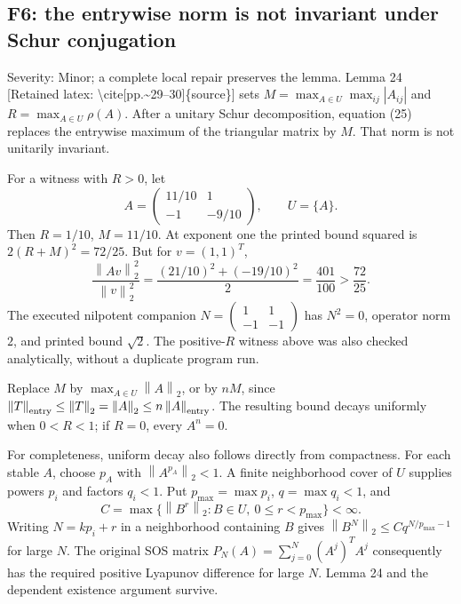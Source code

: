 \documentclass[10pt]{article}
\begin{document}
\subsection*{F6: the entrywise norm is not invariant under Schur conjugation}
Severity: Minor; a complete local repair preserves the lemma. Lemma 24 [Retained latex: \textbackslash{}cite[pp.\textasciitilde{}29--30]\{source\}] sets \(M=\max_{A\in U}\max_{ij}|A_{ij}|\) and \(R=\max_{A\in U}\rho(A)\). After a unitary Schur decomposition, equation (25) replaces the entrywise maximum of the triangular matrix by \(M\). That norm is not unitarily invariant.\par
For a witness with \(R>0\), let \[A=\begin{pmatrix}11/10&1\\-1&-9/10\end{pmatrix},\qquad U=\{A\}.\] Then \(R=1/10\), \(M=11/10\). At exponent one the printed bound squared is \(2(R+M)^2=72/25\). But for \(v=(1,1)^T\), \[\frac{\left\lVert Av\right\rVert_2^2}{\left\lVert v\right\rVert_2^2}
 =\frac{(21/10)^2+(-19/10)^2}{2}
 =\frac{401}{100}>\frac{72}{25}.\] The executed nilpotent companion \(N=\left(\begin{smallmatrix}1&1\\-1&-1\end{smallmatrix}\right)\) has \(N^2=0\), operator norm \(2\), and printed bound \(\sqrt2\). The positive-\(R\) witness above was also checked analytically, without a duplicate program run.\par
Replace \(M\) by \(\max_{A\in U}\left\lVert A\right\rVert_2\), or by \(nM\), since \(\left\lVert T\right\rVert_{\rm entry}\le\left\lVert T\right\rVert_2=\left\lVert A\right\rVert_2\le n\left\lVert A\right\rVert_{\rm entry}\). The resulting bound decays uniformly when \(0<R<1\); if \(R=0\), every \(A^n=0\).\par
For completeness, uniform decay also follows directly from compactness. For each stable \(A\), choose \(p_A\) with \(\left\lVert A^{p_A}\right\rVert_2<1\). A finite neighborhood cover of \(U\) supplies powers \(p_i\) and factors \(q_i<1\). Put \(p_{\max}=\max p_i\), \(q=\max q_i<1\), and \[C=\max\{\left\lVert B^r\right\rVert_2:B\in U,\ 0\le r<p_{\max}\}<\infty.\] Writing \(N=kp_i+r\) in a neighborhood containing \(B\) gives \(\left\lVert B^N\right\rVert_2\le Cq^{N/p_{\max}-1}\) for large \(N\). The original SOS matrix \(P_N(A)=\sum_{j=0}^N(A^j)^TA^j\) consequently has the required positive Lyapunov difference for large \(N\). Lemma 24 and the dependent existence argument survive.\par
\end{document}
